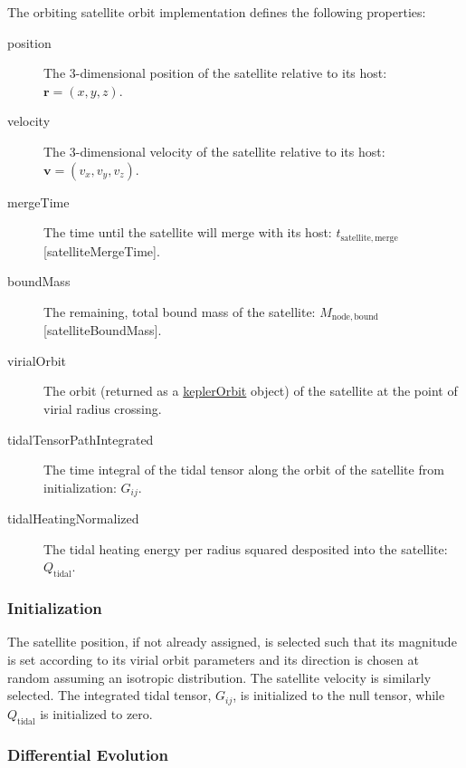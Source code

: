 The orbiting satellite orbit implementation defines the following properties:
\begin{description}
 \item [{\normalfont \ttfamily position}] The 3-dimensional position of the satellite relative to its host: $\mathbf{r}=(x,y,z)$.
 \item [{\normalfont \ttfamily velocity}] The 3-dimensional velocity of the satellite relative to its host: $\mathbf{v}=(v_x,v_y,v_z)$.
 \item [{\normalfont \ttfamily mergeTime}] The time until the satellite will merge with its host: $t_\mathrm{satellite, merge}$ [{\normalfont \ttfamily satelliteMergeTime}].
 \item [{\normalfont \ttfamily boundMass}] The remaining, total bound mass of the satellite: $M_\mathrm{node,bound}$ [{\normalfont \ttfamily satelliteBoundMass}].
 \item[{\normalfont \ttfamily virialOrbit}] The orbit (returned as a \href{https://github.com/galacticusorg/galacticus/releases/download/masterRelease/Galacticus_Development.pdf\#sec.KeplerOrbits}{\normalfont \ttfamily keplerOrbit} object) of the satellite at the point of virial radius crossing.
 \item[{\normalfont \ttfamily tidalTensorPathIntegrated}] The time integral of the tidal tensor along the orbit of the satellite from initialization: $G_{ij}$.
 \item[{\normalfont \ttfamily tidalHeatingNormalized}] The tidal heating energy per radius squared desposited into the satellite: $Q_\mathrm{tidal}$.
\end{description}

\subsubsection{Initialization}

The satellite position, if not already assigned, is selected such that its magnitude is set according to its virial orbit parameters and its direction is chosen at random assuming an isotropic distribution.  The satellite velocity is similarly selected.  The integrated tidal tensor, $G_{ij}$, is initialized to the null tensor, while $Q_\mathrm{tidal}$ is initialized to zero.

\subsubsection{Differential Evolution}

